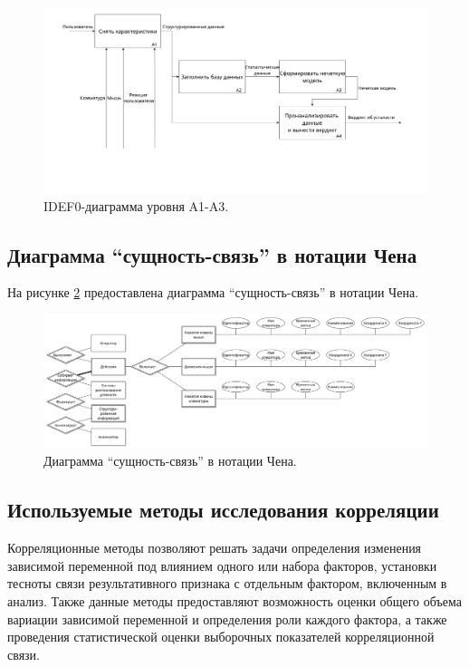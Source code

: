 \begin{figure}[H]
	\centering
	\includegraphics[scale=0.25]{img/A123.pdf}
	\caption{IDEF0-диаграмма уровня A1-A3.}
	\label{fig:idef:1}
\end{figure}

\subsection{Диаграмма ``сущность-связь'' в нотации Чена}
На рисунке \ref{fig:erDiag} предоставлена диаграмма ``сущность-связь'' в нотации Чена.

\begin{figure}[H]
	\centering
	\includegraphics[scale=0.28]{img/chenERDiagram.pdf}
	\caption{Диаграмма ``сущность-связь'' в нотации Чена.}
	\label{fig:erDiag}
\end{figure}


\subsection{Используемые методы исследования корреляции}
Корреляционные методы позволяют решать задачи определения изменения зависимой переменной под влиянием одного или набора факторов, установки тесноты связи результативного признака с отдельным фактором, включенным в анализ. Также данные методы предоставляют возможность оценки общего объема вариации зависимой переменной и определения роли каждого фактора, а также проведения статистической оценки выборочных показателей корреляционной связи. \cite{correlInEco}

